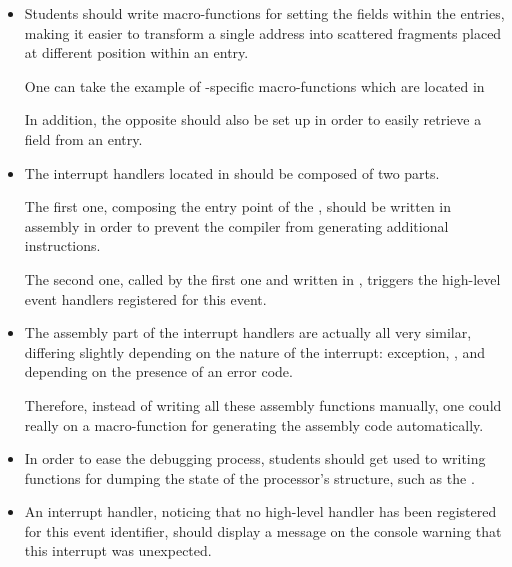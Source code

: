 \begin{itemize}
  \item
    Students should write macro-functions for setting the fields within
    the  entries, making it easier to transform a single address
    into scattered fragments placed at different position within an entry.

    \-

    One can take the example of -specific macro-functions
    which are located in \\

    \-

    In addition, the opposite should also be set up in order to easily
    retrieve a field from an  entry.
  \item
    The interrupt handlers located in  should be
    composed of two parts.

    \-

    The first one, composing the entry point of the , should be written in assembly in order to prevent
    the compiler from generating additional instructions.

    \-

    The second one, called by the first one and written in , triggers
    the high-level event handlers registered for this event.
  \item
    The assembly part of the interrupt handlers are actually all very similar,
    differing slightly depending on the nature of the interrupt: exception,
    ,  \etc{} and depending on the presence of an
    error code.

    \-

    Therefore, instead of writing all these assembly functions manually,
    one could really on a macro-function for generating the assembly
    code automatically.
  \item
    In order to ease the debugging process, students should get used to
    writing functions for dumping the state of the processor's structure,
    such as the .
  \item
    An interrupt handler, noticing that no high-level handler has been
    registered for this event identifier, should display a message on the
    console warning that this interrupt was unexpected.

    \-


\end{itemize}
